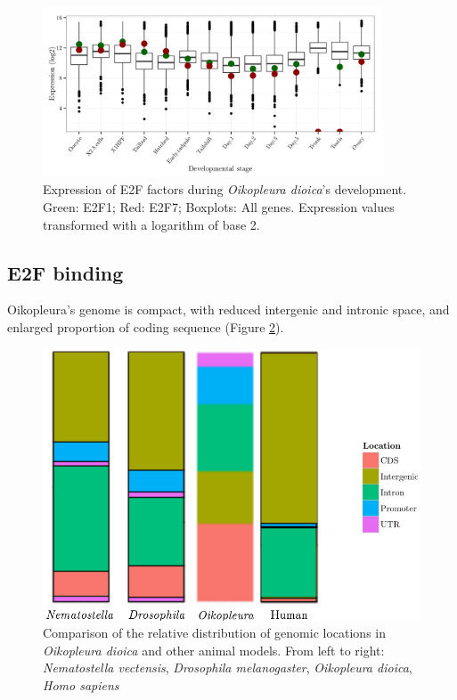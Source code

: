 \documentclass[11pt,twoside,a4paper]{report}
\begin{document}
	\begin{figure}[here]
		\centering
		\includegraphics[width=0.9\textwidth]{pngs/E2F_expression_+allgenes.png}
		\caption{Expression of E2F factors during \textit{Oikopleura dioica}'s development.
			{
				\footnotesize
					Green: E2F1;
					Red: E2F7;
					Boxplots: All genes.
					Expression values transformed with a logarithm of base 2.
			}
		}
		\label{fig:E2F_expression}
	\end{figure}

	\subsection{E2F binding}
	
		Oikopleura's genome is compact, with reduced intergenic and intronic space, and enlarged proportion of coding sequence (Figure \ref{fig:genome_background}).
	
		\begin{figure}[here]
			\centering
			\includegraphics[height=0.5\textwidth]{pngs/species_genome.png}
			\caption{Comparison of the relative distribution of genomic locations in \textit{Oikopleura dioica} and other animal models. {\footnotesize From left to right: \textit{Nematostella vectensis}, \textit{Drosophila melanogaster}, \textit{Oikopleura dioica}, \textit{Homo sapiens}} }
			\label{fig:genome_background}
		\end{figure}
		
\end{document}
